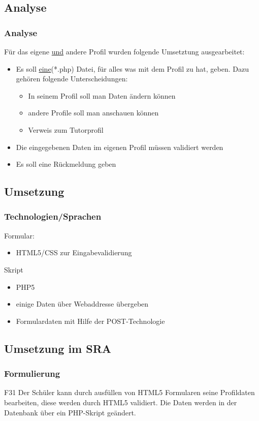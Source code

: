 \subsection{Analyse}
\begin{frame}
 \frametitle{Analyse}
 Für das eigene \underline{und} andere Profil wurden folgende Umsetztung ausgearbeitet:
 \begin{itemize}
  \item Es soll \underline{eine}(*.php) Datei, für alles was mit dem Profil zu hat, geben. Dazu gehören folgende Unterscheidungen:
    \begin{itemize}
     \item In seinem Profil soll man Daten ändern können
     \item andere Profile soll man anschauen können
     \item Verweis zum Tutorprofil
    \end{itemize}
  \item Die eingegebenen Daten im eigenen Profil müssen validiert werden
  \item Es soll eine Rückmeldung geben
 \end{itemize}
\end{frame}
\subsection{Umsetzung}
\begin{frame}
 \frametitle{Technologien/Sprachen}
 Formular:
 \begin{itemize}
  \item HTML5/CSS zur Eingabevalidierung
 \end{itemize}
 Skript
 \begin{itemize}
  \item PHP5
  \item einige Daten über Webaddresse übergeben
  \item Formulardaten mit Hilfe der POST-Technologie
 \end{itemize}
\end{frame}
\subsection{Umsetzung im SRA}
\begin{frame}
 \frametitle{Formulierung}
  \begin{block}{F31}
   Der Schüler kann durch ausfüllen von HTML5 Formularen seine Profildaten bearbeiten, diese werden durch HTML5 validiert. Die Daten werden in der Datenbank über ein PHP-Skript geändert.
  \end{block}
\end{frame}
